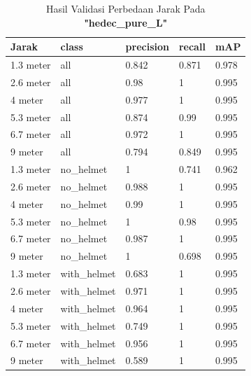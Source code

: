 \begin{enumerate}
  \begin{longtable}{|l|l|l|l|l|} 
    \caption{Hasil Validasi Perbedaan Jarak Pada \textbf{"hedec\_pure\_L"}}
    \label{tb:hasiljarak_hedec_pure_L}\\
    \hline
    Jarak     & class        & precision & recall & mAP    \\ 
    \hline
    1.3 meter & all          & 0.842     & 0.871  & 0.978  \\
    2.6 meter & all          & 0.98      & 1      & 0.995  \\
    4 meter   & all          & 0.977     & 1      & 0.995  \\
    5.3 meter & all          & 0.874     & 0.99   & 0.995  \\
    6.7 meter & all          & 0.972     & 1      & 0.995  \\
    9 meter   & all          & 0.794     & 0.849  & 0.995  \\
    1.3 meter & no\_helmet   & 1         & 0.741  & 0.962  \\
    2.6 meter & no\_helmet   & 0.988     & 1      & 0.995  \\
    4 meter   & no\_helmet   & 0.99      & 1      & 0.995  \\
    5.3 meter & no\_helmet   & 1         & 0.98   & 0.995  \\
    6.7 meter & no\_helmet   & 0.987     & 1      & 0.995  \\
    9 meter   & no\_helmet   & 1         & 0.698  & 0.995  \\
    1.3 meter & with\_helmet & 0.683     & 1      & 0.995  \\
    2.6 meter & with\_helmet & 0.971     & 1      & 0.995  \\
    4 meter   & with\_helmet & 0.964     & 1      & 0.995  \\
    5.3 meter & with\_helmet & 0.749     & 1      & 0.995  \\
    6.7 meter & with\_helmet & 0.956     & 1      & 0.995  \\
    9 meter   & with\_helmet & 0.589     & 1      & 0.995  \\
    \hline
  \end{longtable}


\end{enumerate}
